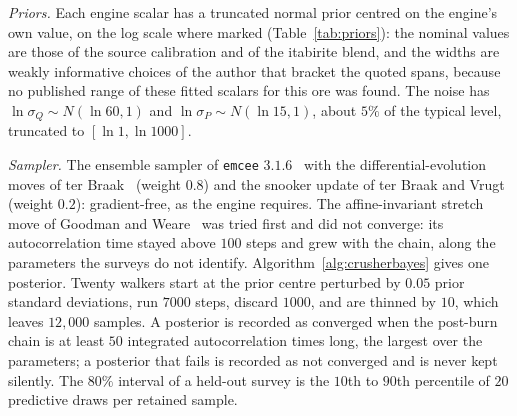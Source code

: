 \emph{Priors.} Each engine scalar has a truncated normal prior centred on the engine's own value, on the log scale where marked
(Table~\ref{tab:priors}): the nominal values are those of the source calibration and of the itabirite blend, and the widths are weakly informative
choices of the author that bracket the quoted spans, because no published range of these fitted scalars for this ore was found. The noise has
$\ln\sigma_Q\sim N(\ln 60,1)$ and $\ln\sigma_P\sim N(\ln 15,1)$, about $5\%$ of the typical level, truncated to $[\ln1,\ln1000]$.

\emph{Sampler.} The ensemble sampler of \texttt{emcee} $3.1.6$~\cite{emcee2013} with the differential-evolution moves of ter
Braak~\cite{terbraak2006} (weight $0.8$) and the snooker update of ter Braak and Vrugt~\cite{terbraak2008} (weight $0.2$): gradient-free, as the
engine requires. The affine-invariant stretch move of Goodman and Weare~\cite{goodman2010} was tried first and did not converge: its autocorrelation
time stayed above $100$ steps and grew with the chain, along the parameters the surveys do not identify. Algorithm~\ref{alg:crusherbayes} gives one
posterior. Twenty walkers start at the prior centre perturbed by $0.05$ prior standard deviations, run $7000$ steps, discard $1000$, and are thinned
by $10$, which leaves $12{,}000$ samples. A posterior is recorded as converged when the post-burn chain is at least $50$ integrated autocorrelation
times long, the largest over the parameters; a posterior that fails is recorded as not converged and is never kept silently. The $80\%$ interval of
a held-out survey is the $10$th to $90$th percentile of $20$ predictive draws per retained sample.

